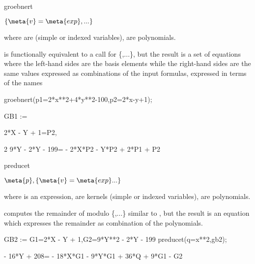 \begin{Operator}{groebnert}
\begin{Syntax}

  \(\{\meta{v}=\meta{exp},...\}\)

\end{Syntax}
where  are  (simple or indexed variables),
 are polynomials.


 is functionally equivalent to a 
call for \{,...\}, but the result is a set of
equations where the left-hand sides are the basis elements while
the right-hand sides are the same values expressed as combinations
of the input formulas, expressed in terms of the names 
\begin{Bigexample}
    groebnert({p1=2*x**2+4*y**2-100,p2=2*x-y+1});

   GB1 := {2*X - Y + 1=P2,

           2
        9*Y  - 2*Y - 199= - 2*X*P2 - Y*P2 + 2*P1 + P2}
\end{Bigexample}
\end{Operator}

\begin{Operator}{preducet}
\begin{Syntax}

\(\meta{p},\{\meta{v}=\meta{exp}...\}\)
\end{Syntax}
where  is an expression,  are kernels 
(simple or indexed variables),
 are polynomials.

 computes the remainder of  modulo \{,...\}
similar to , but the result is an equation
which expresses the remainder as combination of the polynomials.
\begin{Bigexample}
                             
   GB2 := {G1=2*X - Y + 1,G2=9*Y**2  - 2*Y - 199}
   preducet(q=x**2,gb2);

 - 16*Y + 208= - 18*X*G1 - 9*Y*G1 + 36*Q + 9*G1 - G2
\end{Bigexample}
\end{Operator}


